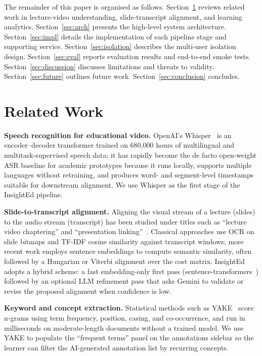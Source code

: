 \documentclass[conference]{IEEEtran}
\begin{document}
The remainder of this paper is organised as follows. Section~\ref{sec:related} reviews related work in lecture-video understanding, slide-transcript alignment, and learning analytics. Section~\ref{sec:arch} presents the high-level system architecture. Section~\ref{sec:impl} details the implementation of each pipeline stage and supporting service. Section~\ref{sec:isolation} describes the multi-user isolation design. Section~\ref{sec:eval} reports evaluation results and end-to-end smoke tests. Section~\ref{sec:discussion} discusses limitations and threats to validity. Section~\ref{sec:future} outlines future work. Section~\ref{sec:conclusion} concludes.

\section{Related Work}\label{sec:related}

\textbf{Speech recognition for educational video.} OpenAI's Whisper~\cite{whisper} is an encoder--decoder transformer trained on 680{,}000 hours of multilingual and multitask-supervised speech data; it has rapidly become the de facto open-weight ASR baseline for academic prototypes because it runs locally, supports multiple languages without retraining, and produces word- and segment-level timestamps suitable for downstream alignment. We use Whisper as the first stage of the InsightEd pipeline.

\textbf{Slide-to-transcript alignment.} Aligning the visual stream of a lecture (slides) to the audio stream (transcript) has been studied under titles such as ``lecture video chaptering'' and ``presentation linking''~\cite{slidealign1, slidealign2}. Classical approaches use OCR on slide bitmaps and TF-IDF cosine similarity against transcript windows; more recent work employs sentence embeddings to compute semantic similarity, often followed by a Hungarian or Viterbi alignment over the cost matrix. InsightEd adopts a hybrid scheme: a fast embedding-only first pass (sentence-transformers~\cite{sbert}) followed by an optional LLM refinement pass that asks Gemini to validate or revise the proposed alignment when confidence is low.

\textbf{Keyword and concept extraction.} Statistical methods such as YAKE~\cite{yake} score n-grams using term frequency, position, casing, and co-occurrence, and run in milliseconds on moderate-length documents without a trained model. We use YAKE to populate the ``frequent terms'' panel on the annotations sidebar so the learner can filter the AI-generated annotation list by recurring concepts.
\end{document}
